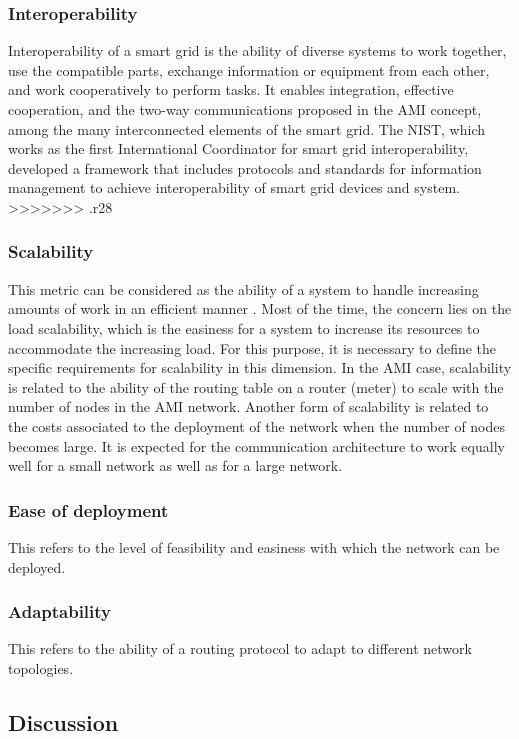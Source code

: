 \documentclass[11pt,draftclsnofoot,onecolumn]{IEEEtran}
\begin{document}
\subsubsection{Interoperability}
Interoperability of a smart grid is the ability of diverse systems to work together, use the compatible parts, exchange information or equipment from each other, and work cooperatively to perform tasks. It enables integration, effective cooperation, and the two-way communications proposed in the AMI concept, among the many interconnected elements of the smart grid. The NIST, which works as the first International Coordinator for smart grid interoperability, developed a framework that includes protocols and standards for information management to achieve interoperability of smart grid devices and system.
>>>>>>> .r28

\subsubsection{Scalability}
This metric can be considered as the ability of a system to handle increasing amounts of work in an efficient manner \cite{Zhou2012}. Most of the time, the concern lies on the load scalability, which is the easiness for a system to increase its resources to accommodate the increasing load. For this purpose, it is necessary to define the specific requirements for scalability in this dimension. In the AMI case, scalability is related to the ability of the routing table on a router (meter) to scale with the number of nodes in the AMI network. Another form of scalability is related to the costs associated to the deployment of the network when the number of nodes becomes large. It is expected for the communication architecture to work equally well for a small network as well as for a large network.


\subsubsection{Ease of deployment}
This refers to the level of feasibility and easiness with which the network can be deployed. 


\subsubsection{Adaptability}
This refers to the ability of a routing protocol to adapt to different network topologies. 

\subsection{Discussion}
\end{document}
